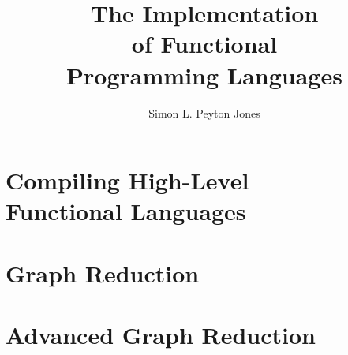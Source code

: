\documentclass[12pt, b5paper, oldfontcommands]{memoir}
\title{{The Implementation\\ of Functional\\ \vspace{10pt}Programming Languages}}
\author{Simon L. Peyton Jones}
\begin{document}



\mainmatter



\part[Compiling High-Level Functional Languages]{Compiling High-Level\\ Functional Languages}










\part[Graph Reduction]{Graph Reduction}











\part[Advanced Graph Reduction]{Advanced Graph Reduction}





%
\end{document}
